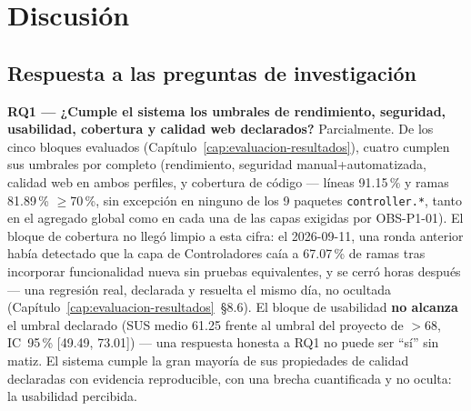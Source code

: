 
\chapter{Discusión}
\label{cap:discusion}

\section{Respuesta a las preguntas de investigación}

\textbf{RQ1 --- ¿Cumple el sistema los umbrales de rendimiento, seguridad,
usabilidad, cobertura y calidad web declarados?} Parcialmente. De los
cinco bloques evaluados (Capítulo~\ref{cap:evaluacion-resultados}), cuatro
cumplen sus umbrales por completo (rendimiento, seguridad
manual+automatizada, calidad web en ambos perfiles, y cobertura de
código --- líneas 91.15\,\% y ramas 81.89\,\% $\geq$70\,\%, sin excepción
en ninguno de los 9 paquetes \texttt{controller.*}, tanto en el
agregado global como en cada una de las capas exigidas por
OBS-P1-01). El bloque de cobertura no llegó limpio a esta cifra: el
2026-09-11, una ronda anterior había detectado que la capa de
Controladores caía a 67.07\,\% de ramas tras incorporar funcionalidad
nueva sin pruebas equivalentes, y se cerró horas después --- una
regresión real, declarada y resuelta el mismo día, no ocultada
(Capítulo~\ref{cap:evaluacion-resultados}~\S8.6). El bloque de usabilidad
\textbf{no alcanza} el umbral declarado (SUS medio 61.25 frente al umbral
del proyecto de $>$68, IC~95\,\% [49.49, 73.01]) --- una respuesta honesta
a RQ1 no puede ser ``sí'' sin matiz. El sistema cumple la gran mayoría de
sus propiedades de calidad declaradas con evidencia reproducible, con una
brecha cuantificada y no oculta: la usabilidad percibida.

